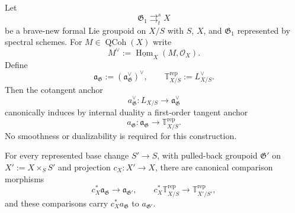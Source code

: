 \begin{theorem}
\label{thm:represented-internal-dual-anchor}
Let
\[
    \mathfrak G_1
    \mathop{\rightrightarrows}^{s}_{t}
    X
\]
be a brave-new formal Lie groupoid on $X/S$ with $S$, $X$, and
$\mathfrak G_1$ represented by spectral schemes.  For
$M\in\operatorname{QCoh}(X)$ write
\[
    M^\vee
    :=
    \underline{\operatorname{Hom}}_X(M,\mathcal O_X).
\]
Define
\[
    \mathfrak a_{\mathfrak G}
    :=
    \left(
        \mathfrak a_{\mathfrak G}^{\vee}
    \right)^\vee,
    \qquad
    \mathbb T^{\mathrm{rep}}_{X/S}
    :=
    L_{X/S}^{\vee}.
\]
Then the cotangent anchor
\[
    a_{\mathfrak G}^{\vee}:
    L_{X/S}\longrightarrow\mathfrak a_{\mathfrak G}^{\vee}
\]
canonically induces by internal duality a first-order tangent anchor
\[
\boxed{
    a_{\mathfrak G}:
    \mathfrak a_{\mathfrak G}
    \longrightarrow
    \mathbb T^{\mathrm{rep}}_{X/S}.
}
\]
No smoothness or dualizability is required for this construction.

For every represented base change $S'\to S$, with pulled-back groupoid
$\mathfrak G'$ on $X':=X\times_SS'$ and projection $c_X:X'\to X$, there are
canonical comparison morphisms
\[
    c_X^*\mathfrak a_{\mathfrak G}
    \longrightarrow
    \mathfrak a_{\mathfrak G'},
    \qquad
    c_X^*\mathbb T^{\mathrm{rep}}_{X/S}
    \longrightarrow
    \mathbb T^{\mathrm{rep}}_{X'/S'},
\]
and these comparisons carry $c_X^*a_{\mathfrak G}$ to
$a_{\mathfrak G'}$.
\end{theorem}

